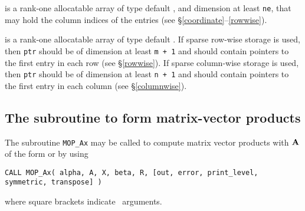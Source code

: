 \documentclass{galahad}
\newcommand{\packagename}{MOP}
\begin{document}
\begin{description}
 is a rank-one allocatable array of type default \integer,
and dimension at least {\tt ne}, that may hold the column indices of the entries
(see \S\ref{coordinate}--\ref{rowwise}).

 is a rank-one allocatable array of type default \integer.
If sparse row-wise storage is used, then {\tt ptr} should be of
dimension at least {\tt m + 1} and should contain pointers to the
first entry in each row (see \S\ref{rowwise}). If sparse column-wise
storage is used, then {\tt ptr} should be of dimension at least {\tt n
  + 1} and should contain pointers to the first entry in each column (see
\S\ref{columnwise}).

\end{description}


\subsection{The subroutine to form matrix-vector products}\label{Ax}

The subroutine {\tt \packagename\_Ax} may be called to compute matrix
vector products with ${\mathbf{A}}$ of the form
or
by using
\vspace*{1mm}

\hspace{8mm}
{\tt CALL \packagename\_Ax( alpha, A, X, beta, R, [out, error,
                            print\_level, symmetric, transpose] )}

\vspace*{1mm}
\noindent where square brackets indicate \optional\ arguments.
\end{document}
